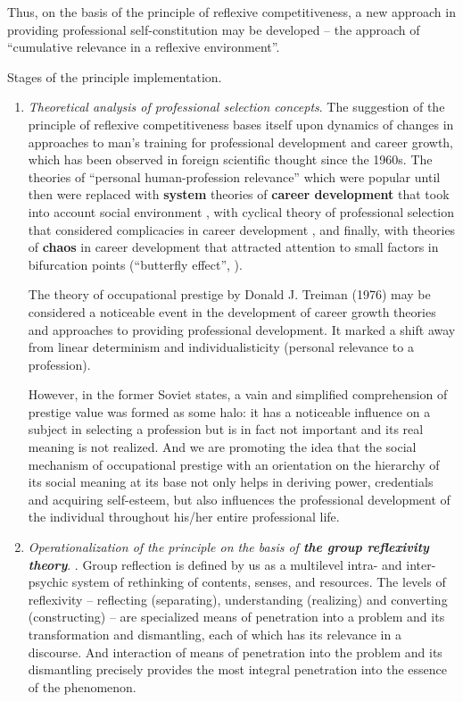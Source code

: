 \documentclass[conference]{IEEEtran}
\begin{document}
Thus, on the basis of the principle of reflexive competitiveness, a new approach in providing professional self-constitution may be developed – the approach of “cumulative relevance in a reflexive environment”.

Stages of the principle implementation.

\begin{enumerate}
	\item \textit{Theoretical analysis of professional selection concepts}. The suggestion of the principle of reflexive competitiveness bases itself upon dynamics of changes in approaches to man’s training for professional development and career growth, which has been observed in foreign scientific thought since the 1960s. The theories of “personal human-profession relevance” which were popular until then were replaced with \textbf{system} theories of \textbf{career development} that took into account social environment \cite{b24,b25}, with cyclical theory of professional selection that considered complicacies in career development \cite{b26}, and finally, with theories of \textbf{chaos} in career development that attracted attention to small factors in bifurcation points (“butterfly effect”, \cite{b27,b28}).
	
	The theory of occupational prestige by Donald J. Treiman (1976) may be considered a noticeable event in the development of career growth theories and approaches to providing professional development. It marked a shift away from linear determinism and individualisticity (personal relevance to a profession).
	
	However, in the former Soviet states, a vain and simplified comprehension of prestige value was formed as some halo: it has a noticeable influence on a subject in selecting a profession but is in fact not important and its real meaning is not realized. And we are promoting the idea that the social mechanism of occupational prestige with an orientation on the hierarchy of its social meaning at its base not only helps in deriving power, credentials and acquiring self-esteem, but also influences the professional development of the individual throughout his/her entire professional life.
	
	\item \textit{Operationalization of the principle on the basis of \textbf{the group reflexivity theory}}. \cite{b4,b6,b11,b10,b7,b9,b15}. Group reflection is defined by us as a multilevel intra- and inter-psychic system of rethinking of contents, senses, and resources. The levels of reflexivity – reflecting (separating), understanding (realizing) and converting (constructing) – are specialized means of penetration into a problem and its transformation and dismantling, each of which has its relevance in a discourse. And interaction of means of penetration into the problem and its dismantling precisely provides the most integral penetration into the essence of the phenomenon.


\end{enumerate}
\end{document}
